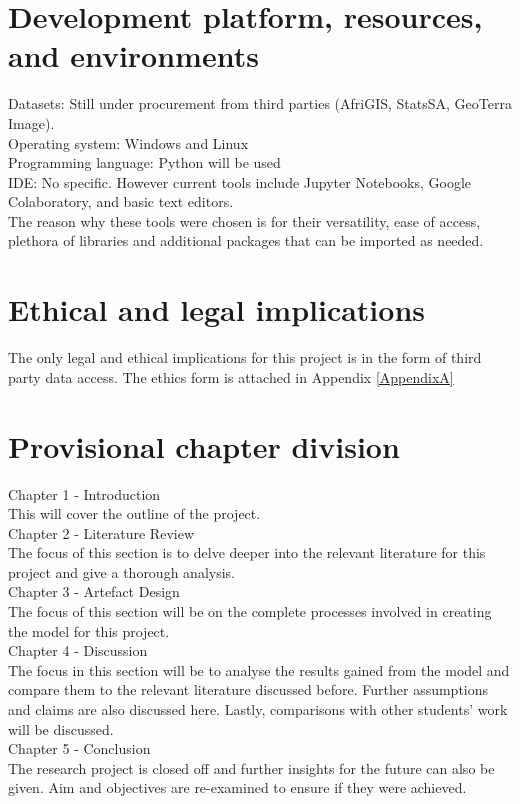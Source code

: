 \section{Development platform, resources, and environments}
Datasets: Still under procurement from third parties (AfriGIS, StatsSA, GeoTerra Image).\\
Operating system: Windows and Linux\\
Programming language: Python will be used\\
IDE: No specific. However current tools include Jupyter Notebooks, Google Colaboratory, and basic text editors.\\
The reason why these tools were chosen is for their versatility, ease of access, plethora of libraries and additional packages that can be imported as needed. 
\section{Ethical and legal implications}
The only legal and ethical implications for this project is in the form of third party data access. The ethics form is attached in Appendix \ref{AppendixA}
\section{Provisional chapter division}
Chapter 1 - Introduction\\
This will cover the outline of the project.\\
Chapter 2 - Literature Review\\
The focus of this section is to delve deeper into the relevant literature for this project and give a thorough analysis.\\
Chapter 3 - Artefact Design\\
The focus of this section will be on the complete processes involved in creating the model for this project.\\
Chapter 4 - Discussion\\
The focus in this section will be to analyse the results gained from the model and compare them to the relevant literature discussed before. Further assumptions and claims are also discussed here. Lastly, comparisons with other students' work will be discussed.\\
Chapter 5 - Conclusion\\
The research project is closed off and further insights for the future can also be given. Aim and objectives are re-examined to ensure if they were achieved.


